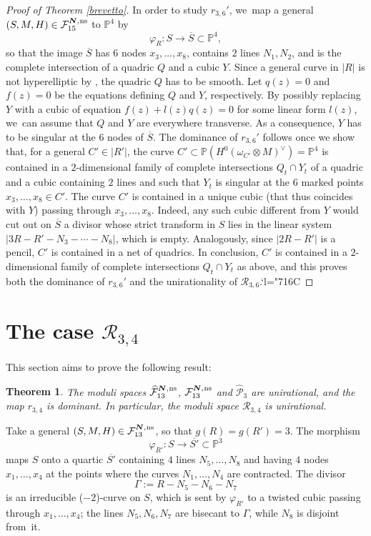 \documentclass[11pt]{article}
\newcommand{\Changelback}{\mathcode`l="716C}
\newcommand{\ns}{{\mkern1mu\mathrm{ns}}}
\newcommand{\bN}{\boldsymbol{N}}
\theoremstyle{plain}
\newtheorem{thm}{Theorem}[section]
\theoremstyle{definition}
\newcommand\PP{{\mathbb P}}
\newcommand\F{{\mathcal F}}
\renewcommand\P{{\mathcal P}}
\newcommand\R{{\mathcal R}}
\begin{document}
\begin{proof}[Proof of Theorem \ref{brevetto}]
In order to study $r_{3,6}'$, we~map a general $(S,M,H)\in \F_{15}^{\bN,\ns}$ to $\PP^4$ by
\[
\varphi_{R}:S\to \overline{S}\subset \mathbb P^4,
\]
so that the image $\overline{S}$ has $6$ nodes $x_3,\ldots, x_8$, contains $2$ lines $N_1,N_2$, and is the complete intersection of a quadric $Q$ and a cubic $Y$. Since a general curve in $|R|$ is not hyperelliptic by \cite[Prop.\,5.6]{DL}, the quadric $Q$ has to be smooth. Let $q(z)=0$ and $f(z)=0$ be the equations defining $Q$ and $Y$, respectively. By possibly replacing $Y$ with a cubic of equation $f(z)+l(z)q(z)=0$ for some linear form $l(z)$, we~can assume that $Q$ and $Y$ are everywhere transverse. As a consequence, $Y$ has to be singular at the $6$ nodes of $\overline{S}$. The dominance of $r_{3,6}'$ follows once we show that, for a general $C'\in |R'|$, the curve $C'\subset \PP(H^0(\omega_{C'}\otimes M)^\vee)=\PP^4$ is contained in a $2$-dimensional family of complete intersections $Q_t\cap Y_t$ of a quadric and a cubic containing $2$ lines and such that $Y_t$ is singular at the $6$ marked points $x_3,\ldots,x_8\in C'$. The curve $C'$ is contained in a unique cubic (that thus coincides with $Y$) passing through $x_3,\ldots, x_8$. Indeed, any such cubic different from $Y$ would cut out on $\overline{S}$ a divisor whose strict transform in $S$ lies in the linear system $|3R-R'-N_3-\cdots-N_8|$, which is empty. Analogously, since
$|2R-R'|$ is a pencil, $C'$ is contained in a net of quadrics. In conclusion, $C'$ is contained in a $2$-dimensional family of complete intersections $Q_t\cap Y_t$ as above, and this proves both the dominance of $r_{3,6}'$ and the unirationality of $\R_{3,6}$.\Changelback
\end{proof}

\section{The case \texorpdfstring{$\R_{3,4}$}{R}}

This section aims to prove the following result:

\begin{thm}\label{ale}
The moduli spaces $\widehat{\F}_{13}^{\bN,\ns}$, $\F_{13}^{\bN,\ns}$ and $\widehat\P_{3}$ are unirational, and the map $r_{3,4}$ is dominant. In particular, the moduli space $\R_{3,4}$ is unirational.
\end{thm}
Take a general $(S,M,H)\in \F_{13}^{\bN,\ns}$, so that $g(R)=g(R')=3$. The morphism
\[
\varphi_{R'}:S\to \overline{S'}\subset\PP^3
\]
maps $S$ onto a quartic $\overline{S'}$ containing $4$ lines $N_5,\ldots,N_8$ and having $4$ nodes $x_1,\ldots,x_4$ at the points where the curves $N_1,\ldots,N_4$ are contracted. The divisor
\[
\Gamma:=R-N_5-N_6-N_7
\]
is an irreducible ($-2$)-curve on $S$, which is sent by $\varphi_{R'}$ to a twisted cubic passing through $x_1,\ldots,x_4$; the lines $N_5,N_6,N_7$
are bisecant to $\Gamma$, while $N_8$ is disjoint from~it.
\end{document}
